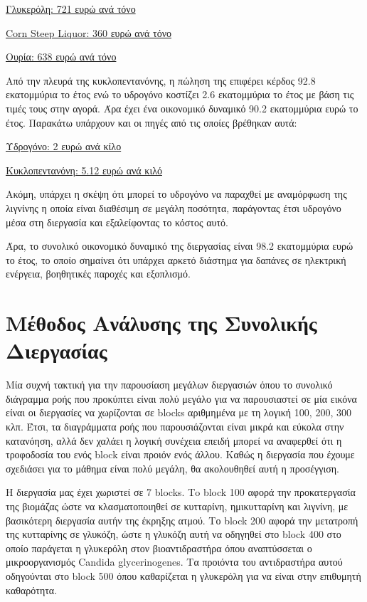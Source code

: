 \documentclass[11pt]{article}
\begin{document}
\href{https://www.selinawamucii.com/insights/prices/united-states-of-america/glycerol/}{Γλυκερόλη: 721 ευρώ ανά τόνο}

\href{https://www.indiamart.com/proddetail/corn-steep-liquor-15744963191.html}{Corn Steep Liquor: 360 ευρώ ανά τόνο}

\href{https://tradingeconomics.com/commodity/urea}{Ουρία: 638 ευρώ ανά τόνο}

Από την πλευρά της κυκλοπεντανόνης, η πώληση της επιφέρει κέρδος 92.8 εκατομμύρια το έτος ενώ το υδρογόνο κοστίζει 2.6 εκατομμύρια το έτος με βάση τις τιμές τους στην αγορά. Άρα έχει ένα οικονομικό δυναμικό 90.2 εκατομμύρια ευρώ το έτος. Παρακάτω υπάρχουν και οι πηγές από τις οποίες βρέθηκαν αυτά:

\href{https://www.sgh2energy.com/economics}{Υδρογόνο: 2 ευρώ ανά κίλο}

\href{https://dir.indiamart.com/impcat/cyclopentanone.html}{Κυκλοπεντανόνη: 5.12 ευρώ ανά κιλό}

Ακόμη, υπάρχει η σκέψη ότι μπορεί το υδρογόνο να παραχθεί με αναμόρφωση της λιγνίνης η οποία είναι διαθέσιμη σε μεγάλη ποσότητα, παράγοντας έτσι υδρογόνο μέσα στη διεργασία και εξαλείφοντας το κόστος αυτό. 

Άρα, το συνολικό οικονομικό δυναμικό της διεργασίας είναι 98.2 εκατομμύρια ευρώ το έτος, το οποίο σημαίνει ότι υπάρχει αρκετό διάστημα για δαπάνες σε ηλεκτρική ενέργεια, βοηθητικές παροχές και εξοπλισμό.

\section{Μέθοδος Ανάλυσης της Συνολικής Διεργασίας}
\label{sec:org62648cf}
Μία συχνή τακτική για την παρουσίαση μεγάλων διεργασιών όπου το συνολικό διάγραμμα ροής που προκύπτει είναι πολύ μεγάλο για να παρουσιαστεί σε μία εικόνα είναι οι διεργασίες να χωρίζονται σε blocks αριθμημένα με τη λογική 100, 200, 300 κλπ. Έτσι, τα διαγράμματα ροής που παρουσιάζονται είναι μικρά και εύκολα στην κατανόηση, αλλά δεν χαλάει η λογική συνέχεια επειδή μπορεί να αναφερθεί ότι η τροφοδοσία του ενός block είναι προιόν ενός άλλου. Καθώς η διεργασία που έχουμε σχεδιάσει για το μάθημα είναι πολύ μεγάλη, θα ακολουθηθεί αυτή η προσέγγιση.

Η διεργασία μας έχει χωριστεί σε 7 blocks. Τo block 100 αφορά την προκατεργασία της βιομάζας ώστε να κλασματοποιηθεί σε κυτταρίνη, ημικυτταρίνη και λιγνίνη, με βασικότερη διεργασία αυτήν της έκρηξης ατμού. Το block 200 αφορά την μετατροπή της κυτταρίνης σε γλυκόζη, ώστε η γλυκόζη αυτή να οδηγηθεί στο block 400 στο οποίο παράγεται η γλυκερόλη στον βιοαντιδραστήρα όπου αναπτύσσεται ο μικροοργανισμός Candida glycerinogenes. Tα προιόντα του αντιδραστήρα αυτού οδηγούνται στο block 500 όπου καθαρίζεται η γλυκερόλη για να είναι στην επιθυμητή καθαρότητα.
\end{document}
